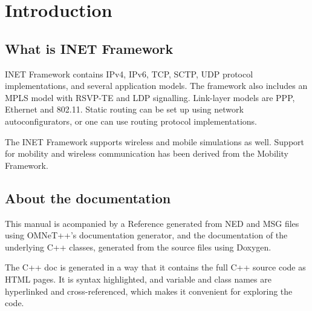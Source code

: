 \chapter{Introduction}
\label{cha:introduction}


\section{What is INET Framework}

INET Framework contains IPv4, IPv6, TCP, SCTP, UDP protocol implementations,
and several application models. The framework also includes an MPLS model
with RSVP-TE and LDP signalling. Link-layer models are PPP, Ethernet and 802.11.
Static routing can be set up using network autoconfigurators, or one can use
routing protocol implementations.

The INET Framework supports wireless and mobile simulations as well. Support
for mobility and wireless communication has been derived from the
Mobility Framework.


\section{About the documentation}

This manual is acompanied by a Reference generated from NED and MSG files using
OMNeT++'s documentation generator, and the documentation of the underlying C++ classes,
generated from the source files using Doxygen.

The C++ doc is generated in a way that it contains the full C++ source code
as HTML pages. It is syntax highlighted, and variable and class names are hyperlinked
and cross-referenced, which makes it convenient for exploring the code.


\iffalse TODO
\section{Contents of this Manual}

todo...
\fi




